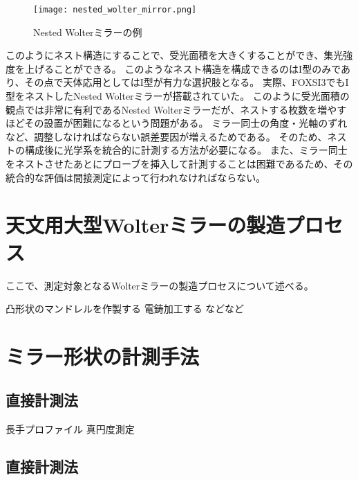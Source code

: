 \begin{figure}[b]
\centering
\texttt{[image: nested\_wolter\_mirror.png]}
\caption{Nested Wolterミラーの例}
\label{fig:nested_wolter_mirror}
\end{figure}

このようにネスト構造にすることで、受光面積を大きくすることができ、集光強度を上げることができる。
このようなネスト構造を構成できるのはI型のみであり、その点で天体応用としてはI型が有力な選択肢となる。
実際、FOXSI3でもI型をネストしたNested Wolterミラーが搭載されていた。
このように受光面積の観点では非常に有利であるNested Wolterミラーだが、ネストする枚数を増やすほどその設置が困難になるという問題がある。
ミラー同士の角度・光軸のずれなど、調整しなければならない誤差要因が増えるためである。
そのため、ネストの構成後に光学系を統合的に計測する方法が必要になる。
また、ミラー同士をネストさせたあとにプローブを挿入して計測することは困難であるため、その統合的な評価は間接測定によって行われなければならない。

\clearpage
\newpage
\section{天文用大型Wolterミラーの製造プロセス}
\label{chap1_wolter_fabrication_process}

ここで、測定対象となるWolterミラーの製造プロセスについて述べる。

凸形状のマンドレルを作製する
電鋳加工する
などなど

\clearpage
\newpage
\section{ミラー形状の計測手法}
\label{chap1_method_for_mirror_metric}

\subsection{直接計測法}
長手プロファイル
真円度測定

\subsection{直接計測法}


\clearpage
\newpage

